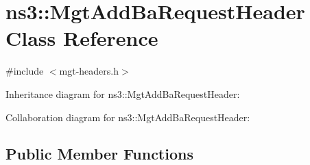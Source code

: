 \hypertarget{classns3_1_1MgtAddBaRequestHeader}{}\section{ns3\+:\+:Mgt\+Add\+Ba\+Request\+Header Class Reference}
\label{classns3_1_1MgtAddBaRequestHeader}


{\ttfamily \#include $<$mgt-\/headers.\+h$>$}



Inheritance diagram for ns3\+:\+:Mgt\+Add\+Ba\+Request\+Header\+:


Collaboration diagram for ns3\+:\+:Mgt\+Add\+Ba\+Request\+Header\+:
\subsection*{Public Member Functions}
